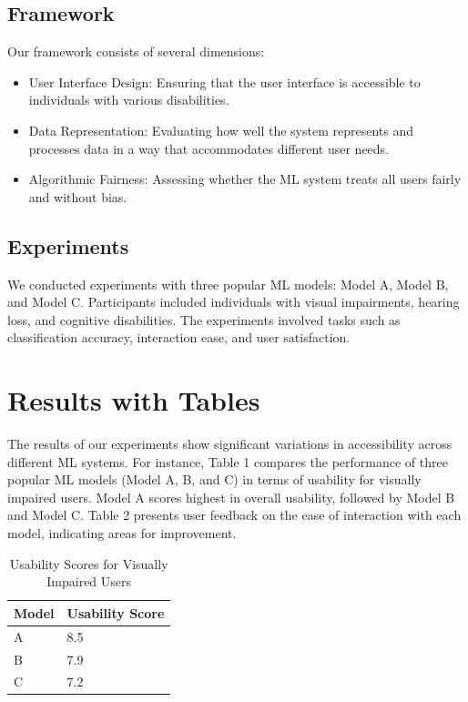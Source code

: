 \documentclass{article}
\begin{document}
\subsection{Framework}
Our framework consists of several dimensions:
\begin{itemize}
    \item User Interface Design: Ensuring that the user interface is accessible to individuals with various disabilities.
    \item Data Representation: Evaluating how well the system represents and processes data in a way that accommodates different user needs.
    \item Algorithmic Fairness: Assessing whether the ML system treats all users fairly and without bias.
\end{itemize}

\subsection{Experiments}
We conducted experiments with three popular ML models: Model A, Model B, and Model C. Participants included individuals with visual impairments, hearing loss, and cognitive disabilities. The experiments involved tasks such as classification accuracy, interaction ease, and user satisfaction.

\section{Results with Tables}
The results of our experiments show significant variations in accessibility across different ML systems. For instance, Table 1 compares the performance of three popular ML models (Model A, B, and C) in terms of usability for visually impaired users. Model A scores highest in overall usability, followed by Model B and Model C. Table 2 presents user feedback on the ease of interaction with each model, indicating areas for improvement.

\begin{table}[ht]
\centering
\caption{Usability Scores for Visually Impaired Users}
\label{tab:usability_scores}
\begin{tabular}{@{}ll@{}}
\toprule
Model & Usability Score \\
\midrule
A     & 8.5            \\
B     & 7.9            \\
C     & 7.2            \\

\bottomrule
\end{tabular}
\end{table}
\end{document}
